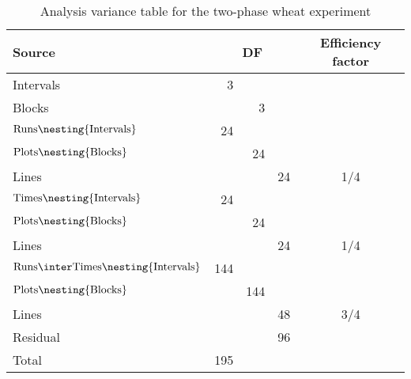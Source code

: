 \begin{table}[htbp]
\begin{center}
\begin{tabular}{lrrrc}
Source & \multicolumn {3}{c}{DF} & Efficiency factor \\
\hline
Intervals & 3 \\
\quad Blocks & & 3          \\
$\mbox{Runs} \nesting{\mbox{Intervals}}$ & 24\\
\quad $\mbox{Plots} \nesting{\mbox{Blocks}}$ & & 24          \\
\qquad Lines   & & & 24 & 1/4  \\
$\mbox{Times} \nesting{\mbox{Intervals}}$ & 24\\
\quad $\mbox{Plots} \nesting{\mbox{Blocks}}$ & & 24          \\
\qquad Lines   & & & 24 & 1/4  \\
$\mbox{Runs} \inter \mbox{Times} \nesting{\mbox{Intervals}}$ & 144 \\
\quad $\mbox{Plots} \nesting{\mbox{Blocks}}$ & & 144          \\
\qquad Lines   & & & 48 & 3/4  \\
\qquad Residual  & & & 96        \\
\hline
Total            & 195
\end{tabular}
\end{center}
\caption{Analysis variance table for the two-phase wheat experiment}
\label{tab:ANOVAWheat}
\end{table}
